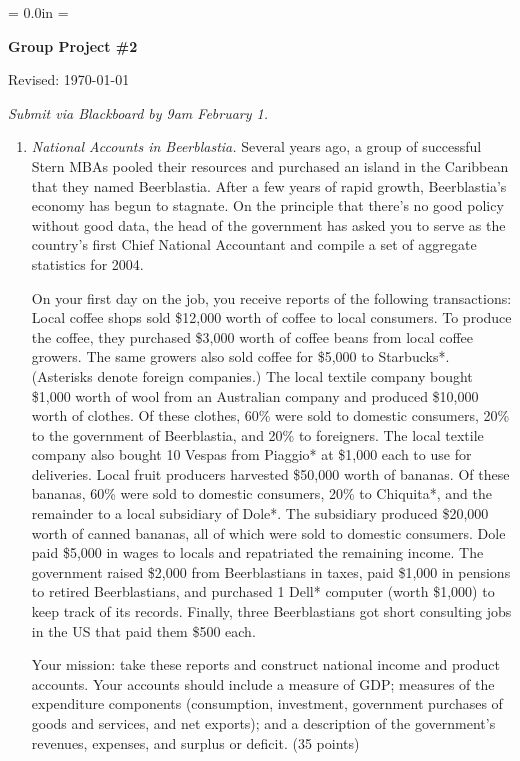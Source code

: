 \documentclass[letterpaper,12pt]{article}
\begin{document}
\parindent = 0.0in
\parskip = \bigskipamount
\thispagestyle{empty}%
\Head

\centerline{\large \bf Group Project \#2}%
\centerline{Revised:  \today}

\medskip
{\it Submit via Blackboard by 9am February 1.}

\begin{enumerate}
\item {\it National Accounts in Beerblastia.} 
Several years ago,
a group of successful Stern MBAs pooled their resources and
purchased an island in the Caribbean that they named Beerblastia.
After a few years of rapid growth, Beerblastia's economy has begun
to stagnate.  On the principle that there's no good policy without
good data, the head of the government has asked you to serve as
the country's first Chief National Accountant and compile a
set of aggregate statistics for 2004.

On your first day on the job, you receive reports of the following
transactions: Local coffee shops sold \$12,000 worth of coffee to
local consumers. To produce the coffee, they purchased \$3,000
worth of coffee beans from local coffee growers. The same growers
also sold coffee for \$5,000 to Starbucks*. (Asterisks denote
foreign companies.) The local textile company bought \$1,000 worth
of wool from an Australian company and produced \$10,000 worth of
clothes.  Of these clothes, 60\% were sold to domestic consumers,
20\% to the government of Beerblastia, and 20\% to foreigners. The
local textile company also bought 10 Vespas from Piaggio* at
\$1,000 each to use for deliveries. Local fruit producers
harvested \$50,000 worth of bananas. Of these bananas, 60\% were
sold to domestic consumers, 20\% to Chiquita*, and the remainder
to a local subsidiary of Dole*. The subsidiary produced \$20,000
worth of canned bananas, all of which were sold to domestic
consumers. Dole paid \$5,000 in wages to locals and repatriated
the remaining income.  The government raised \$2,000 from
Beerblastians in taxes, paid \$1,000 in pensions to retired
Beerblastians, and purchased 1 Dell* computer (worth \$1,000) to
keep track of its records. Finally, three Beerblastians got short
consulting jobs in the US that paid them \$500 each.

Your mission:  take these reports and construct national income
and product accounts.  Your accounts should include a measure of
GDP;  measures of the expenditure components (consumption,
investment, government purchases of goods and services, and net
exports); and a description of the government's revenues,
expenses, and surplus or deficit.  (35 points)



\end{enumerate}
\end{document}
